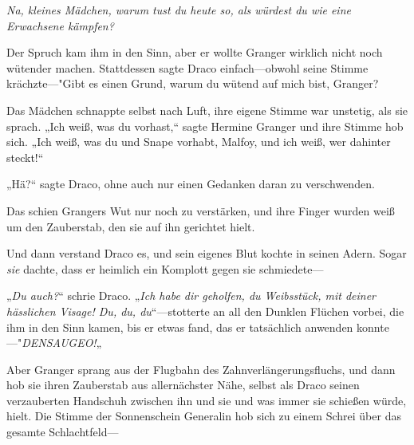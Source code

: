\emph{Na, kleines Mädchen, warum tust du heute so, als würdest du wie eine Erwachsene kämpfen?}

Der Spruch kam ihm in den Sinn, aber er wollte Granger wirklich nicht noch wütender machen. Stattdessen sagte Draco einfach—obwohl seine Stimme krächzte—"Gibt es einen Grund, warum du wütend auf mich bist, Granger?

Das Mädchen schnappte selbst nach Luft, ihre eigene Stimme war unstetig, als sie sprach. „Ich weiß, was du vorhast,“ sagte Hermine Granger und ihre Stimme hob sich. „Ich weiß, was du und Snape vorhabt, Malfoy, und ich weiß, wer dahinter steckt!“

„Hä?“ sagte Draco, ohne auch nur einen Gedanken daran zu verschwenden.

Das schien Grangers Wut nur noch zu verstärken, und ihre Finger wurden weiß um den Zauberstab, den sie auf ihn gerichtet hielt.

Und dann verstand Draco es, und sein eigenes Blut kochte in seinen Adern. Sogar \emph{sie} dachte, dass er heimlich ein Komplott gegen sie schmiedete—

„\emph{Du auch?}“ schrie Draco. „\emph{Ich habe dir geholfen, du Weibsstück, mit deiner hässlichen Visage! Du, du, du}“—stotterte an all den Dunklen Flüchen vorbei, die ihm in den Sinn kamen, bis er etwas fand, das er tatsächlich anwenden konnte—"\emph{DENSAUGEO!}„

Aber Granger sprang aus der Flugbahn des Zahnverlängerungsfluchs, und dann hob sie ihren Zauberstab aus allernächster Nähe, selbst als Draco seinen verzauberten Handschuh zwischen ihn und sie und was immer sie schießen würde, hielt. Die Stimme der Sonnenschein Generalin hob sich zu einem Schrei über das gesamte Schlachtfeld—

